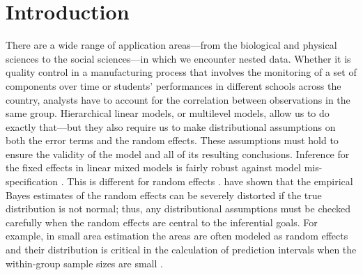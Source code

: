 \documentclass[12pt]{article} %
\newcommand{\hh}[1]{{\color{orange} #1}}
\newcommand{\al}[1]{{\color{red} #1}}
\begin{document}
\section{Introduction}\label{sec:intro}
There are a wide range of application areas---from the biological and physical sciences to the social sciences---in which we encounter nested  data.
Whether it is quality control in a manufacturing process that involves the monitoring of a set of components over  time  or students' performances in different schools across the country, analysts have to account for  the correlation between observations in the same group.  Hierarchical linear models, or multilevel models, allow us to do exactly that---but they also require us to make distributional assumptions on both the error terms and the random effects. These assumptions must hold to ensure the validity of the model and all of its resulting conclusions. 
Inference for the fixed effects in linear mixed models is fairly robust against model mis-specification \citep{Butler:1992tx, Verbeke:1997tf}. This is different for random effects \citep{Verbeke:1996va, Verbeke:1997tf}. 
 \citet{Verbeke:1996va} have shown that the empirical Bayes estimates of the random effects can be severely distorted if the true distribution is not normal; thus, any distributional assumptions must be checked carefully when the random effects are central to the inferential goals.
For example, in small area estimation the areas are often modeled as random effects and their distribution is critical in the calculation of prediction intervals when the  within-group sample sizes are small \citep[see][for a cogent discussion of this issue]{Jiang:2001dx}. 

\end{document}
